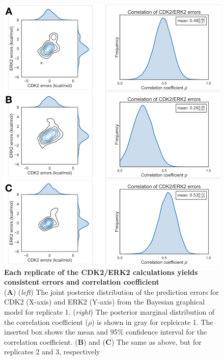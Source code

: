 \documentclass[phd,tocprelim]{cornell}
\begin{document}
\begin{appendices}
	\begin{landscape}
		\begin{figure}[p]
			\centering
			\includegraphics[width=0.48\linewidth]{figures/supp_figure7.pdf}
			\caption[Each replicate of the CDK2/ERK2 calculations yields consistent errors and correlation coefficient]{
				{\bf Each replicate of the CDK2/ERK2 calculations yields consistent errors and correlation coefficient} \\
				({\bf A}) (\emph{left}) The joint posterior distribution of the prediction errors for CDK2 (X-axis) and ERK2 (Y-axis) from the Bayesian graphical model for replicate 1. (\emph{right}) The posterior marginal distribution of the correlation coefficient ($\rho$) is shown in gray for replcicate 1. The inserted box shows the mean and 95\% confidence interval for the correlation coefficient. ({\bf B}) and ({\bf C}) The same as above, but for replicates 2 and 3, respectively
			}
			\label{fig:sup-figure-7}
		\end{figure}
	\end{landscape}
	

\end{appendices}
\end{document}
